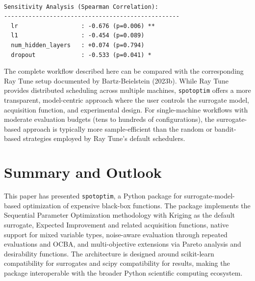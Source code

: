 \documentclass[
  twocolumn]{article}
\begin{document}
\begin{verbatim}

Sensitivity Analysis (Spearman Correlation):
--------------------------------------------------
  lr                  : -0.676 (p=0.006) **
  l1                  : -0.454 (p=0.089)
  num_hidden_layers   : +0.074 (p=0.794)
  dropout             : -0.533 (p=0.041) *
\end{verbatim}

The complete workflow described here can be compared with the
corresponding Ray Tune setup documented by Bartz-Beielstein (2023b).
While Ray Tune provides distributed scheduling across multiple machines,
\texttt{spotoptim} offers a more transparent, model-centric approach
where the user controls the surrogate model, acquisition function, and
experimental design. For single-machine workflows with moderate
evaluation budgets (tens to hundreds of configurations), the
surrogate-based approach is typically more sample-efficient than the
random or bandit-based strategies employed by Ray Tune's default
schedulers.

\section{Summary and Outlook}\label{sec-outlook}

This paper has presented \texttt{spotoptim}, a Python package for
surrogate-model-based optimization of expensive black-box functions. The
package implements the Sequential Parameter Optimization methodology
with Kriging as the default surrogate, Expected Improvement and related
acquisition functions, native support for mixed variable types,
noise-aware evaluation through repeated evaluations and OCBA, and
multi-objective extensions via Pareto analysis and desirability
functions. The architecture is designed around scikit-learn
compatibility for surrogates and scipy compatibility for results, making
the package interoperable with the broader Python scientific computing
ecosystem.
\end{document}
